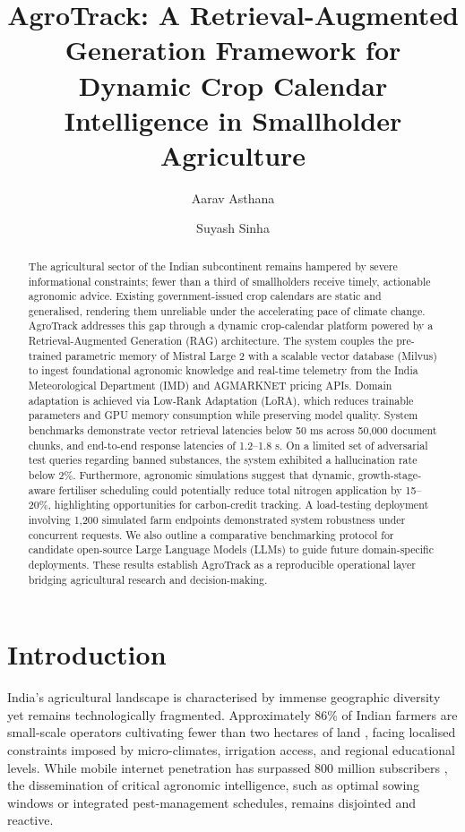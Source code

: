 \documentclass[10pt,twocolumn,letterpaper]{article}
\begin{document}
\title{AgroTrack: A Retrieval-Augmented Generation Framework for Dynamic Crop Calendar Intelligence in Smallholder Agriculture}

\author{Aarav Asthana \and Suyash Sinha}

\maketitle

\begin{abstract}
The agricultural sector of the Indian subcontinent remains hampered by severe informational constraints; fewer than a third of smallholders receive timely, actionable agronomic advice. Existing government-issued crop calendars are static and generalised, rendering them unreliable under the accelerating pace of climate change. AgroTrack addresses this gap through a dynamic crop-calendar platform powered by a Retrieval-Augmented Generation (RAG) architecture. The system couples the pre-trained parametric memory of Mistral Large 2 with a scalable vector database (Milvus) to ingest foundational agronomic knowledge and real-time telemetry from the India Meteorological Department (IMD) and AGMARKNET pricing APIs. Domain adaptation is achieved via Low-Rank Adaptation (LoRA), which reduces trainable parameters and GPU memory consumption while preserving model quality. System benchmarks demonstrate vector retrieval latencies below 50 ms across 50,000 document chunks, and end-to-end response latencies of 1.2–1.8 s. On a limited set of adversarial test queries regarding banned substances, the system exhibited a hallucination rate below 2\%. Furthermore, agronomic simulations suggest that dynamic, growth-stage-aware fertiliser scheduling could potentially reduce total nitrogen application by 15–20\%, highlighting opportunities for carbon-credit tracking. A load-testing deployment involving 1,200 simulated farm endpoints demonstrated system robustness under concurrent requests. We also outline a comparative benchmarking protocol for candidate open-source Large Language Models (LLMs) to guide future domain-specific deployments. These results establish AgroTrack as a reproducible operational layer bridging agricultural research and decision-making.
\end{abstract}

\section{Introduction}
India's agricultural landscape is characterised by immense geographic diversity yet remains technologically fragmented. Approximately 86\% of Indian farmers are small-scale operators cultivating fewer than two hectares of land \cite{ICAR_2023}, facing localised constraints imposed by micro-climates, irrigation access, and regional educational levels. While mobile internet penetration has surpassed 800 million subscribers \cite{GSMA_2024}, the dissemination of critical agronomic intelligence, such as optimal sowing windows or integrated pest-management schedules, remains disjointed and reactive.
\end{document}
